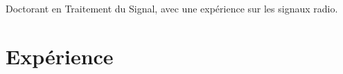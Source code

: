\documentclass[11pt,a4paper,sans]{moderncv}        %
\begin{document}
\makecvtitle

Doctorant en Traitement du Signal, avec une expérience sur les signaux radio.

\section{Expérience}

\vspace{6pt}
\end{document}
